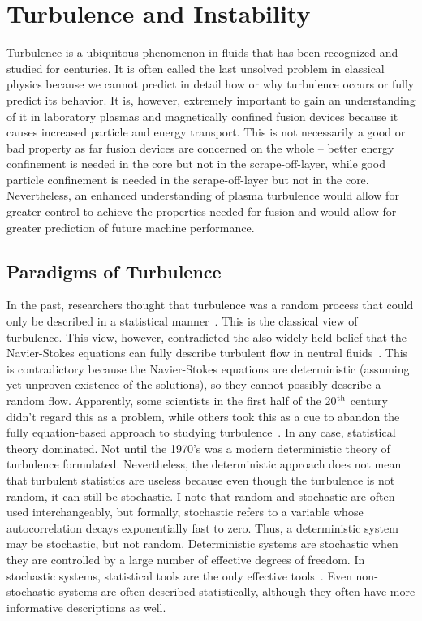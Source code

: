 \chapter{Turbulence and Instability}
\label{c_turb_and_inst}

Turbulence is a ubiquitous phenomenon in fluids that has been recognized and studied for centuries. It is often called the last unsolved problem in classical physics because we cannot predict in detail how or why
turbulence occurs or fully predict its behavior. It is, however, extremely important to gain an understanding of it in laboratory plasmas and magnetically confined
fusion devices because it causes increased particle and energy
transport. This is not necessarily a good or bad property as far fusion devices are concerned on the whole -- better energy confinement is needed in the core but not in the scrape-off-layer,
while good particle confinement is needed in the scrape-off-layer but not in the core. Nevertheless, an enhanced understanding of plasma turbulence would allow for greater control to achieve
the properties needed for fusion and would allow for greater prediction of future machine performance.

\section{Paradigms of Turbulence}
\label{s_turb_paradigms}

In the past, researchers thought that turbulence was a random process that could only be described in a statistical manner~\cite{tennekes1972}. This is the classical view of turbulence.
This view, however, contradicted the also widely-held belief that the Navier-Stokes equations can fully describe turbulent flow in neutral fluids~\cite{mcdonough04}. 
This is contradictory because the Navier-Stokes equations are deterministic (assuming yet unproven existence of the solutions), so they cannot possibly describe a random flow.
Apparently, some scientists in the first half of the 20$^{\rm{th}}$ century didn't regard this as a problem, while others took this as a cue to abandon the fully equation-based approach 
to studying turbulence~\cite{tennekes1972}. In any case, statistical theory dominated. 
Not until the 1970's was a modern deterministic theory of turbulence formulated. Nevertheless, the deterministic approach does
not mean that turbulent statistics are useless because even though the turbulence is not random, it can still be stochastic. I note that random and stochastic are often used interchangeably,
but formally, stochastic refers to a variable whose autocorrelation decays exponentially fast to zero. Thus, a deterministic system may be stochastic, but not random. Deterministic systems are
stochastic when they are controlled by a large number of effective degrees of freedom. In stochastic systems, 
statistical tools are the only effective tools~\cite{mcdonough04}. Even non-stochastic systems are often described statistically, although they often have more informative descriptions as well.

